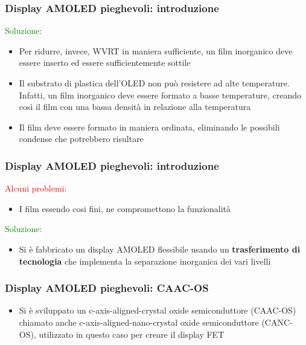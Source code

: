 \documentclass[12pt]{beamer}
\begin{document}
	\begin{frame}
		\frametitle{Display AMOLED pieghevoli: introduzione}
		\textcolor{green}{Soluzione:}
		\begin{itemize}
			\item Per ridurre, invece, WVRT in maniera sufficiente, un film inorganico deve essere inserto ed essere sufficientemente sottile
			\pause
			\item Il substrato di plastica dell’OLED non può resistere ad alte temperature. Infatti, un film inorganico deve essere
			formato a basse temperature, creando così il film con una bassa densità in relazione alla temperatura
			\pause
			\item Il film deve essere formato in maniera ordinata, eliminando le possibili condense che potrebbero risultare
		\end{itemize}
	\end{frame}
	\begin{frame}
		\frametitle{Display AMOLED pieghevoli: introduzione}
		\textcolor{red}{Alcuni problemi:}
		\begin{itemize}
			\item I film essendo cosi fini, ne compromettono la funzionalità
			\pause
		\end{itemize}
		\textcolor{green}{Soluzione:}
		\begin{itemize}
			\item Si è fabbricato un display AMOLED flessibile usando un \textbf{trasferimento di tecnologia} che implementa la separazione inorganica dei vari livelli
		\end{itemize}
	\end{frame}
	\begin{frame}
		\frametitle{Display AMOLED pieghevoli: CAAC-OS}
		\begin{itemize}
			\item Si è sviluppato un c-axis-aligned-crystal oxide semiconduttore (CAAC-OS) chiamato anche c-axis-aligned-nano-crystal oxide semiconduttore (CANC-OS), utilizzato in questo caso per creare il display FET
		\end{itemize}
	\end{frame}
\end{document}
